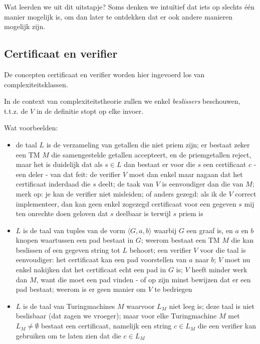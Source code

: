 Wat leerden we uit dit uitstapje? Soms denken we intu\"itief dat iets
op slechts \'{e}\'{e}n manier mogelijk is, om dan later te ontdekken
dat er ook andere manieren mogelijk zijn.

\subsection{Certificaat en verifier}

De concepten certificaat en verifier worden hier ingevoerd los van
complexiteitsklassen.


In de context van complexiteitstheorie zullen we enkel {\em
beslissers} beschouwen, t.t.z. de $V$ in de definitie stopt op elke
invoer.


Wat voorbeelden:
\begin{itemize}
\item 
de taal $L$ is de verzameling van getallen die niet priem zijn; er
bestaat zeker een TM $M$ die samengestelde getallen accepteert, en de
priemgetallen reject, maar het is duidelijk dat als $s \in L$ dan
bestaat er voor die $s$ een certificaat $c$ - een deler - van dat
feit: de verifier $V$ moet dan enkel maar nagaan dat het certificaat
inderdaad die $s$ deelt; de taak van $V$ is eenvoudiger dan die van
$M$; merk op: je kan de verifier niet misleiden; of anders gezegd: als
ik de $V$ correct implementeer, dan kan geen enkel zogezegd
certificaat voor een gegeven $s$ mij ten onrechte doen geloven dat $s$
deelbaar is terwijl $s$ priem is

\item 
$L$ is de taal van tuples van de vorm $\langle G,a,b \rangle$ waarbij $G$ een graaf
is, en $a$ en $b$ knopen waartussen een pad bestaat in $G$; weerom
bestaat een TM $M$ die kan beslissen of een gegeven string tot $L$
behoort; een verifier $V$ voor die taal is eenvoudiger: het
certificaat kan een pad voorstellen van $a$ naar $b$; $V$ moet nu
enkel nakijken dat het certificaat echt een pad in $G$ is; $V$ heeft
minder werk dan $M$, want die moet een pad vinden - of op zijn minst
bewijzen dat er een pad bestaat; weerom is er geen manier om $V$ te
bedriegen

\item
$L$ is de taal van Turingmachines $M$ waarvoor $L_M$ niet leeg is;
deze taal is niet beslisbaar (dat zagen we vroeger); maar voor elke
Turingmachine $M$ met $L_M \neq \emptyset$ bestaat een certificaat,
namelijk een string $c \in L_M$ die een verifier kan gebruiken om te
laten zien dat die $c \in L_M$ 

\end{itemize}

